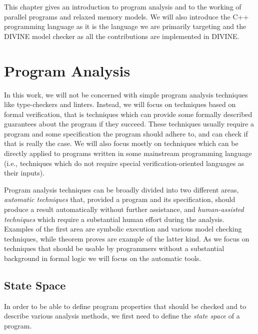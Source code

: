 This chapter gives an introduction to program analysis and to the working of
parallel programs and relaxed memory models.
We will also introduce the C++ programming language as it is the language we are primarily targeting and the DIVINE model checker as all the contributions are implemented in DIVINE.

\section{Program Analysis} %

In this work, we will not be concerned with simple program analysis techniques like type-checkers and linters.
Instead, we will focus on techniques based on formal verification, that is techniques which can provide some formally described guarantees about the program if they succeed.
These techniques usually require a program and some specification the program should adhere to, and can check if that is really the case.
We will also focus mostly on techniques which can be directly applied to programs written in some mainstream programming language (i.e., techniques which do not require special verification-oriented languages as their inputs).

Program analysis techniques can be broadly divided into two different areas, \emph{automatic techniques} that, provided a program and its specification, should produce a result automatically without further assistance, and \emph{human-assisted techniques} which require a substantial human effort during the analysis.
Examples of the first area are symbolic execution and various model checking techniques, while theorem proves are example of the latter kind.
As we focus on techniques that should be usable by programmers without a substantial background in formal logic we will focus on the automatic tools.


\subsection{State Space}

In order to be able to define program properties that should be checked and to describe various analysis methods, we first need to define the \emph{state space} of a program.

